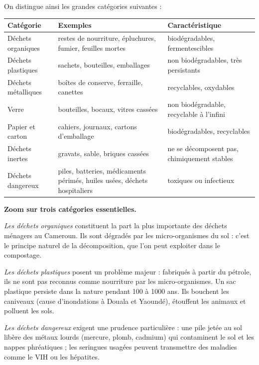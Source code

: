 \documentclass[11pt]{article}
\begin{document}
On distingue ainsi les grandes catégories suivantes :

\begin{center}
\begin{tabularx}{\linewidth}{|l|X|X|}
\hline
\rowcolor{popblueL} \textbf{Catégorie} & \textbf{Exemples} & \textbf{Caractéristique} \\
\hline
Déchets organiques & restes de nourriture, épluchures, fumier, feuilles mortes & biodégradables, fermentescibles \\
\hline
Déchets plastiques & sachets, bouteilles, emballages & non biodégradables, très persistants \\
\hline
Déchets métalliques & boîtes de conserve, ferraille, canettes & recyclables, oxydables \\
\hline
Verre & bouteilles, bocaux, vitres cassées & non biodégradable, recyclable à l'infini \\
\hline
Papier et carton & cahiers, journaux, cartons d'emballage & biodégradables, recyclables \\
\hline
Déchets inertes & gravats, sable, briques cassées & ne se décomposent pas, chimiquement stables \\
\hline
Déchets dangereux & piles, batteries, médicaments périmés, huiles usées, déchets hospitaliers & toxiques ou infectieux \\
\hline
\end{tabularx}
\end{center}

\textbf{Zoom sur trois catégories essentielles.}

\emph{Les déchets organiques} constituent la part la plus importante des déchets ménagers au Cameroun. Ils sont dégradés par les micro-organismes du sol : c'est le principe naturel de la décomposition, que l'on peut exploiter dans le compostage.

\emph{Les déchets plastiques} posent un problème majeur : fabriqués à partir du pétrole, ils ne sont pas reconnus comme nourriture par les micro-organismes. Un sac plastique persiste dans la nature pendant \num{100} à \num{1 000} ans. Ils bouchent les caniveaux (cause d'inondations à Douala et Yaoundé), étouffent les animaux et polluent les sols.

\emph{Les déchets dangereux} exigent une prudence particulière : une pile jetée au sol libère des métaux lourds (mercure, plomb, cadmium) qui contaminent le sol et les nappes phréatiques ; les seringues usagées peuvent transmettre des maladies comme le VIH ou les hépatites.
\end{document}
